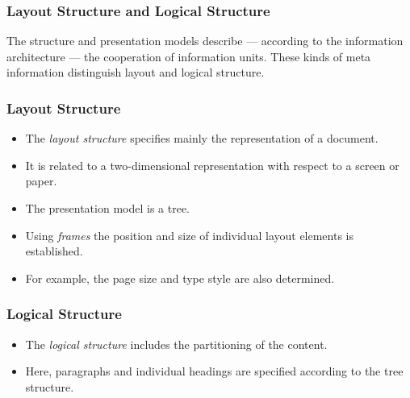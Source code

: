 \subsubsection*{Layout Structure and Logical Structure}

The structure and presentation models describe — according to the information architecture — the cooperation of information units. These kinds of meta information distinguish layout and logical structure.

\subsubsection*{Layout Structure}
\begin{multicols}{2}
	\begin{itemize}
		\item The \textit{layout structure} specifies mainly the representation of a document. 
		\item It is related to a two-dimensional representation with respect to a screen or paper. 
		\item The presentation model is a tree. 
		\item Using \textit{frames} the position and size of individual layout elements is established. 
		\item For example, the page size and type style are also determined.
	\end{itemize}
\end{multicols}

\subsubsection*{Logical Structure}
\begin{multicols}{2}
	\begin{itemize}
		\item The \textit{logical structure} includes the partitioning of the content. 
		\item Here, paragraphs and individual headings are specified according to the tree structure. 
	\end{itemize}
\end{multicols}
		


